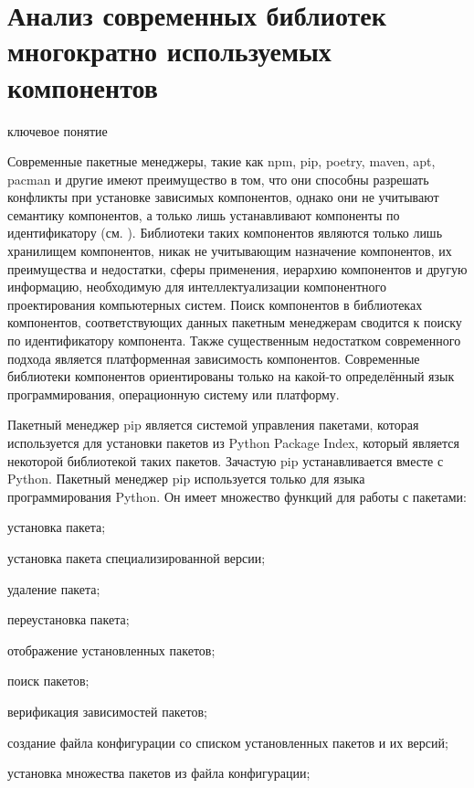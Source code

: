 \section{Анализ современных библиотек многократно используемых компонентов}
\label{ostis_library_analysis}

\begin{SCn}
\begin{scnrelfromlist}{ключевое понятие}
\end{scnrelfromlist}
\end{SCn}

\bigskip

Современные пакетные менеджеры, такие как npm, pip, poetry, maven, apt, pacman и другие имеют преимущество в том, что они способны разрешать конфликты при установке зависимых компонентов, однако они не учитывают семантику компонентов, а только лишь устанавливают компоненты по идентификатору (см. ). Библиотеки таких компонентов являются только лишь хранилищем компонентов, никак не учитывающим назначение компонентов, их преимущества и недостатки, сферы применения, иерархию компонентов и другую информацию, необходимую для интеллектуализации компонентного проектирования компьютерных систем. Поиск компонентов в библиотеках компонентов, соответствующих данных пакетным менеджерам сводится к поиску по идентификатору компонента. Также существенным недостатком современного подхода является платформенная зависимость компонентов. Современные библиотеки компонентов ориентированы только на какой-то определённый язык программирования, операционную систему или платформу.

Пакетный менеджер pip является системой управления пакетами, которая используется для установки пакетов из Python Package Index, который является некоторой библиотекой таких пакетов. Зачастую pip устанавливается вместе с Python. Пакетный менеджер pip используется только для языка программирования Python. 
Он имеет множество функций для работы с пакетами:

\begin{textitemize}
	\item установка пакета;
	\item установка пакета специализированной версии;
	\item удаление пакета;
	\item переустановка пакета;
	\item отображение установленных пакетов;
	\item поиск пакетов;
	\item верификация зависимостей пакетов;
	\item создание файла конфигурации со списком установленных пакетов и их версий;
	\item установка множества пакетов из файла конфигурации;
\end{textitemize}

